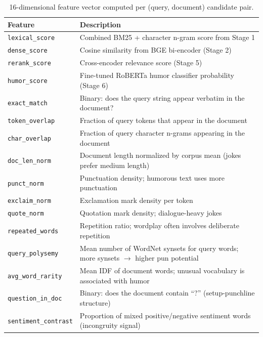 \begin{table}[H]
\centering
\footnotesize
\begin{tabular}{|p{3.2cm}|p{9cm}|}
\hline
\textbf{Feature} & \textbf{Description} \\\hline
\texttt{lexical\_score}      & Combined BM25 + character n-gram score from Stage 1 \\\hline
\texttt{dense\_score}        & Cosine similarity from BGE bi-encoder (Stage 2) \\\hline
\texttt{rerank\_score}       & Cross-encoder relevance score (Stage 5) \\\hline
\texttt{humor\_score}        & Fine-tuned RoBERTa humor classifier probability (Stage 6) \\\hline
\texttt{exact\_match}        & Binary: does the query string appear verbatim in the document? \\\hline
\texttt{token\_overlap}      & Fraction of query tokens that appear in the document \\\hline
\texttt{char\_overlap}       & Fraction of query character n-grams appearing in the document \\\hline
\texttt{doc\_len\_norm}      & Document length normalized by corpus mean (jokes prefer medium length) \\\hline
\texttt{punct\_norm}         & Punctuation density; humorous text uses more punctuation \\\hline
\texttt{exclaim\_norm}       & Exclamation mark density per token \\\hline
\texttt{quote\_norm}         & Quotation mark density; dialogue-heavy jokes \\\hline
\texttt{repeated\_words}     & Repetition ratio; wordplay often involves deliberate repetition \\\hline
\texttt{query\_polysemy}     & Mean number of WordNet synsets for query words; more synsets $\to$ higher pun potential \\\hline
\texttt{avg\_word\_rarity}   & Mean IDF of document words; unusual vocabulary is associated with humor \\\hline
\texttt{question\_in\_doc}   & Binary: does the document contain ``?'' (setup-punchline structure) \\\hline
\texttt{sentiment\_contrast} & Proportion of mixed positive/negative sentiment words (incongruity signal) \\\hline
\end{tabular}
\caption{16-dimensional feature vector computed per (query, document) candidate pair.}
\label{tab:features}
\end{table}

